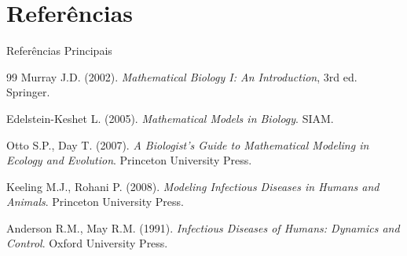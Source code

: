 \section{Referências}

\begin{frame}{Referências Principais}
\begin{thebibliography}{99}
 Murray J.D. (2002). \textit{Mathematical Biology I: An Introduction}, 3rd ed. Springer.

 Edelstein-Keshet L. (2005). \textit{Mathematical Models in Biology}. SIAM.

 Otto S.P., Day T. (2007). \textit{A Biologist's Guide to Mathematical Modeling in Ecology and Evolution}. Princeton University Press.

 Keeling M.J., Rohani P. (2008). \textit{Modeling Infectious Diseases in Humans and Animals}. Princeton University Press.

 Anderson R.M., May R.M. (1991). \textit{Infectious Diseases of Humans: Dynamics and Control}. Oxford University Press.
\end{thebibliography}
\end{frame}

